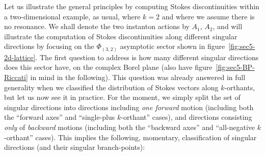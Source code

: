 \documentclass[11pt,a4paper]{article}
\begin{document}
Let us illustrate the general principles by computing Stokes discontinuities within a two-dimensional example, as usual, where $k=2$ and where we assume there is no resonance. We shall denote the two instanton actions by $A_1$, $A_2$, and will illustrate the computation of Stokes discontinuities along different singular directions by focusing on the  $\Phi_{(3,2)}$ asymptotic sector shown in figure~\ref{fig:sec5-2d-lattice}. The first question to address is how many different singular directions does this sector have, on the complex Borel plane (also have figure~\ref{fig:sec5-BP-Riccati} in mind in the following). This question was already answered in full generality when we classified the distribution of Stokes vectors along $k$-orthants, but let us now see it in practice. For the moment, we simply split the set of singular directions into directions including \textit{one forward} motion (including both the ``forward axes'' and ``single-plus $k$-orthant'' cases), and directions consisting \textit{only} of \textit{backward} motions (including both the ``backward axes'' and ``all-negative $k$-orthant'' cases). This implies the following, momentary, classification of singular directions (and their singular branch-points):
%
\end{document}
